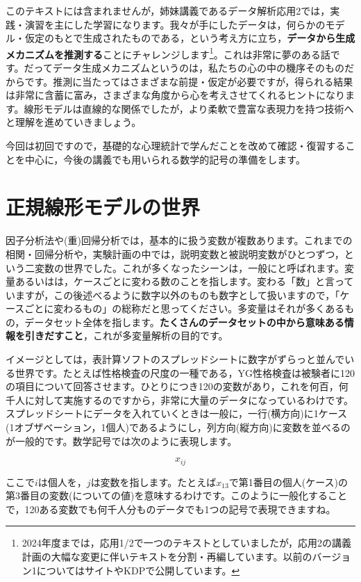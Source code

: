 \documentclass{ltjsbook}
\begin{document}
このテキストには含まれませんが，姉妹講義であるデータ解析応用2では，実践・演習を主にした学習になります。我々が手にしたデータは，何らかのモデル・仮定のもとで生成されたものである，という考え方に立ち，\textbf{データから生成メカニズムを推測する}ことにチャレンジします\footnote{2024年度までは，応用1/2で一つのテキストとしていましたが，応用2の講義計画の大幅な変更に伴いテキストを分割・再編しています。以前のバージョン1についてはサイトやKDPで公開しています。}。これは非常に夢のある話です。だってデータ生成メカニズムというのは，私たちの心の中の機序そのものだからです。推測に当たってはさまざまな前提・仮定が必要ですが，得られる結果は非常に含蓄に富み，さまざまな角度から心を考えさせてくれるヒントになります。線形モデルは直線的な関係でしたが，より柔軟で豊富な表現力を持つ技術へと理解を進めていきましょう。

今回は初回ですので，基礎的な心理統計で学んだことを改めて確認・復習することを中心に，今後の講義でも用いられる数学的記号の準備をします。

\section{正規線形モデルの世界}

因子分析法や(重)回帰分析では，基本的に扱う変数が複数あります。これまでの相関・回帰分析や，実験計画の中では，説明変数と被説明変数がひとつずつ，という二変数の世界でした。これが多くなったシーンは，一般にと呼ばれます。変量あるいはは，ケースごとに変わる数のことを指します。変わる「数」と言っていますが，この後述べるように数字以外のものも数字として扱いますので，「ケースごとに変わるもの」の総称だと思ってください。多変量はそれが多くあるもの，データセット全体を指します。\textbf{たくさんのデータセットの中から意味ある情報を引きだすこと}，これが多変量解析の目的です。

イメージとしては，表計算ソフトのスプレッドシートに数字がずらっと並んでいる世界です。たとえば性格検査の尺度の一種である，YG性格検査は被験者に120の項目について回答させます。ひとりにつき120の変数があり，これを何百，何千人に対して実施するのですから，非常に大量のデータになっているわけです。スプレッドシートにデータを入れていくときは一般に，一行(横方向)に1ケース(1オブザベーション，1個人)であるようにし，列方向(縦方向)に変数を並べるのが一般的です。数学記号では次のように表現します。

\[ x_{ij }\]

ここで$i$は個人を，$j$は変数を指します。たとえば$x_{13}$で第1番目の個人(ケース)の第3番目の変数(についての値)を意味するわけです。このように一般化することで，120ある変数でも何千人分ものデータでも1つの記号で表現できますね。
\end{document}
